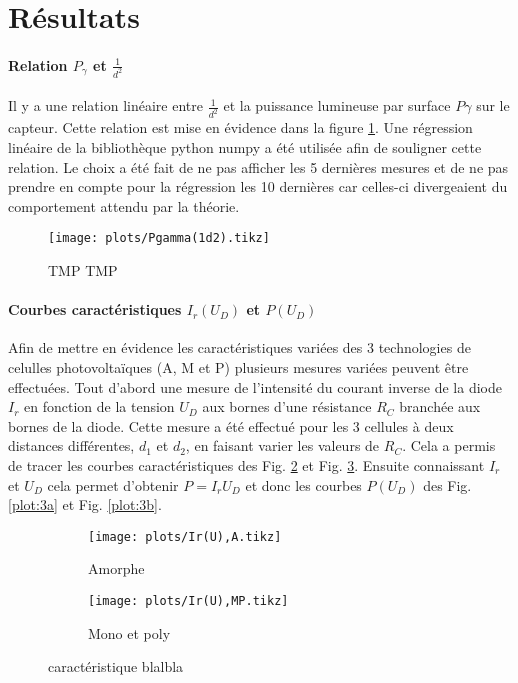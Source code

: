 \section{Résultats}

\paragraph*{Relation \(P_\gamma\) et \(\frac{1}{d^2}\)}
Il y a une relation linéaire entre \(\frac{1}{d^2}\) et la puissance lumineuse par surface \(P\gamma\) sur le capteur. Cette relation est mise en évidence dans la figure \ref{plot:1}. Une régression linéaire de la bibliothèque python numpy a été utilisée afin de souligner cette relation.
Le choix a été fait de ne pas afficher les 5 dernières mesures et de ne pas prendre en compte pour la régression les 10 dernières car celles-ci divergeaient du comportement attendu par la théorie.


\begin{figure}[h]
    \centering
    \texttt{[image: plots/Pgamma(1d2).tikz]}
    \caption{TMP TMP}
    \label{plot:1}
\end{figure}

\paragraph*{Courbes caractéristiques \(I_r(U_D)\) et \(P(U_D)\)}
Afin de mettre en évidence les caractéristiques variées des 3 technologies de celulles photovoltaïques (A, M et P) plusieurs mesures variées peuvent être effectuées.
Tout d'abord une mesure de l'intensité du courant inverse de la diode \(I_r\) en fonction de la tension \(U_D\) aux bornes d'une résistance \(R_C\) branchée aux bornes de la diode.
Cette mesure a été effectué pour les 3 cellules à deux distances différentes, \(d_1\) et \(d_2\), en faisant varier les valeurs de \(R_C\). Cela a permis de tracer les courbes caractéristiques des Fig. \ref{plot:2a} et Fig. \ref{plot:2b}.
Ensuite connaissant \(I_r\) et \(U_D\) cela permet d'obtenir \(P = I_r U_D\) et donc les courbes \(P(U_D)\) des Fig. \ref{plot:3a} et Fig. \ref{plot:3b}.

\begin{figure}
    \centering
    \begin{subfigure}[c]{0.4\linewidth}
        \centering
        \texttt{[image: plots/Ir(U),A.tikz]}
        \caption{Amorphe}
        \label{plot:2a}
    \end{subfigure}
    \begin{subfigure}[c]{0.4\linewidth}
        \centering
        \texttt{[image: plots/Ir(U),MP.tikz]}
        \caption{Mono et poly}
        \label{plot:2b}
    \end{subfigure}
    \caption{caractéristique blalbla}
    \label{plot:2}
\end{figure}

